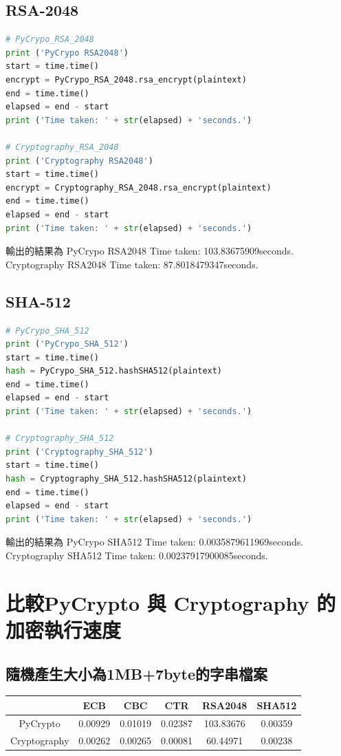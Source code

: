\documentclass[12pt,a4paper]{article}
\begin{document}
\subsection{RSA-2048}
{
\begin{lstlisting}[language=Python]
# PyCrypo_RSA_2048
print ('PyCrypo RSA2048')
start = time.time()
encrypt = PyCrypo_RSA_2048.rsa_encrypt(plaintext)
end = time.time()
elapsed = end - start
print ('Time taken: ' + str(elapsed) + 'seconds.')

# Cryptography_RSA_2048
print ('Cryptography RSA2048')
start = time.time()
encrypt = Cryptography_RSA_2048.rsa_encrypt(plaintext)
end = time.time()
elapsed = end - start
print ('Time taken: ' + str(elapsed) + 'seconds.')	
\end{lstlisting}
輸出的結果為
\newline PyCrypo RSA2048
Time taken: 103.83675909seconds.
\newline Cryptography RSA2048
Time taken: 87.8018479347seconds.
}

\subsection{SHA-512}
{
\begin{lstlisting}[language=Python]
# PyCrypo_SHA_512
print ('PyCrypo_SHA_512')
start = time.time()
hash = PyCrypo_SHA_512.hashSHA512(plaintext)
end = time.time()
elapsed = end - start
print ('Time taken: ' + str(elapsed) + 'seconds.')

# Cryptography_SHA_512
print ('Cryptography_SHA_512')
start = time.time()
hash = Cryptography_SHA_512.hashSHA512(plaintext)
end = time.time()
elapsed = end - start
print ('Time taken: ' + str(elapsed) + 'seconds.')	
\end{lstlisting}
輸出的結果為
\newline PyCrypo SHA512
Time taken: 0.0035879611969seconds.
\newline Cryptography SHA512
Time taken: 0.00237917900085seconds.
}

\newpage %
\section{比較PyCrypto 與 Cryptography 的加密執行速度}

\subsection{隨機產生大小為1MB+7byte的字串檔案}
{
	\begin{frame}
	\par
	\bigskip
	\begin{center}
	\begin{tabular}{|c|c|c|c|c|c|} \hline
	\textsc{} & ECB & CBC & CTR & RSA2048 & SHA512 \\ \hline
	PyCrypto & 0.00929 & 0.01019 & 0.02387 & 103.83676 & 0.00359\\ \hline
	Cryptography & 0.00262 & 0.00265 & 0.00081 & 60.44971 & 0.00238\\ \hline
	\end{tabular}
	\end{center}
	\par
	\bigskip
	\end{frame}
}
\end{document}
